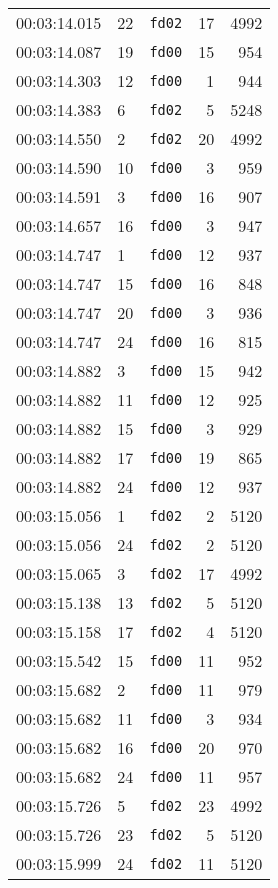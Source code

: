 \documentclass{article}
\begin{document}
\begin{longtable}{lllrr}
00:03:14.015 & 22 & \texttt{fd02} & 17 & 4992 \\
00:03:14.087 & 19 & \texttt{fd00} & 15 & 954 \\
00:03:14.303 & 12 & \texttt{fd00} & 1 & 944 \\
00:03:14.383 & 6 & \texttt{fd02} & 5 & 5248 \\
00:03:14.550 & 2 & \texttt{fd02} & 20 & 4992 \\
00:03:14.590 & 10 & \texttt{fd00} & 3 & 959 \\
00:03:14.591 & 3 & \texttt{fd00} & 16 & 907 \\
00:03:14.657 & 16 & \texttt{fd00} & 3 & 947 \\
00:03:14.747 & 1 & \texttt{fd00} & 12 & 937 \\
00:03:14.747 & 15 & \texttt{fd00} & 16 & 848 \\
00:03:14.747 & 20 & \texttt{fd00} & 3 & 936 \\
00:03:14.747 & 24 & \texttt{fd00} & 16 & 815 \\
00:03:14.882 & 3 & \texttt{fd00} & 15 & 942 \\
00:03:14.882 & 11 & \texttt{fd00} & 12 & 925 \\
00:03:14.882 & 15 & \texttt{fd00} & 3 & 929 \\
00:03:14.882 & 17 & \texttt{fd00} & 19 & 865 \\
00:03:14.882 & 24 & \texttt{fd00} & 12 & 937 \\
00:03:15.056 & 1 & \texttt{fd02} & 2 & 5120 \\
00:03:15.056 & 24 & \texttt{fd02} & 2 & 5120 \\
00:03:15.065 & 3 & \texttt{fd02} & 17 & 4992 \\
00:03:15.138 & 13 & \texttt{fd02} & 5 & 5120 \\
00:03:15.158 & 17 & \texttt{fd02} & 4 & 5120 \\
00:03:15.542 & 15 & \texttt{fd00} & 11 & 952 \\
00:03:15.682 & 2 & \texttt{fd00} & 11 & 979 \\
00:03:15.682 & 11 & \texttt{fd00} & 3 & 934 \\
00:03:15.682 & 16 & \texttt{fd00} & 20 & 970 \\
00:03:15.682 & 24 & \texttt{fd00} & 11 & 957 \\
00:03:15.726 & 5 & \texttt{fd02} & 23 & 4992 \\
00:03:15.726 & 23 & \texttt{fd02} & 5 & 5120 \\
00:03:15.999 & 24 & \texttt{fd02} & 11 & 5120 \\

\end{longtable}
\end{document}
